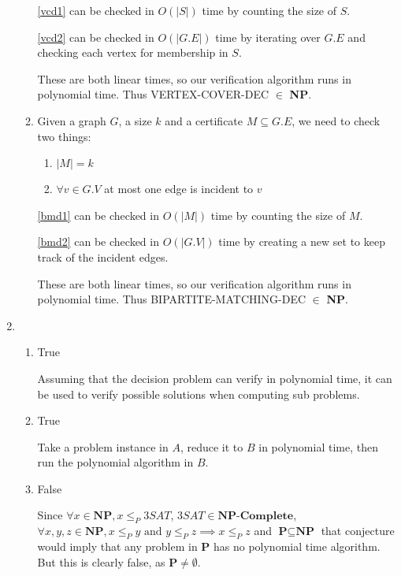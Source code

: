 \documentclass[12pt,letterpaper]{article}
\begin{document}
\begin{enumerate}
\begin{enumerate}
          \ref{vcd1} can be checked in $O(|S|)$ time by counting the size of $S$.

          \ref{vcd2} can be checked in $O(|G.E|)$ time by iterating over $G.E$ and checking each vertex for membership in $S$.

          These are both linear times, so our verification algorithm runs in polynomial time.
          Thus VERTEX-COVER-DEC $\in$ \textbf{NP}.
        \item
          Given a graph $G$, a size $k$ and a certificate $M \subseteq G.E$,
          we need to check two things:
          \begin{enumerate}
            \item $|M| = k$ \label{bmd1}
            \item $\forall v \in G.V$ at most one edge is incident to $v$ \label{bmd2}
          \end{enumerate}

          \ref{bmd1} can be checked in $O(|M|)$ time by counting the size of $M$.

          \ref{bmd2} can be checked in $O(|G.V|)$ time by creating a new set to keep track of the incident edges.

          These are both linear times, so our verification algorithm runs in polynomial time.
          Thus BIPARTITE-MATCHING-DEC $\in$ \textbf{NP}.
      \end{enumerate}

    \item
      \begin{enumerate}
        \item True

          Assuming that the decision problem can verify in polynomial time,
          it can be used to verify possible solutions when computing sub problems.
        \item True

          Take a problem instance in $A$,
          reduce it to $B$ in polynomial time,
          then run the polynomial algorithm in $B$.
        \item False

          Since
          $\forall x \in \textbf{NP}, x \le_{P} 3SAT$,
          $3SAT \in \textbf{NP-Complete}$,
          $\forall x, y, z \in \textbf{NP}, x \le_{P} y \text{ and } y \le_{P} z \implies x \le_{P} z$ and
          $\textbf{P} \subseteq \textbf{NP}$ that conjecture would imply that
          any problem in \textbf{P} has no polynomial time algorithm.
          But this is clearly false, as $\textbf{P} \ne \emptyset$.
      \end{enumerate}
  \end{enumerate}
\end{document}
